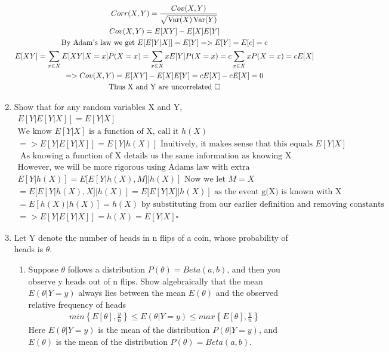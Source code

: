 \documentclass[11pt]{article}
\newcommand{\Var}{\mathop{\rm Var}}
\begin{document}
\begin{enumerate}
\begin{gather}
	Corr(X,Y) = \frac{Cov(X,Y)}{\sqrt{\Var(X)\Var(Y)}}\\
	Cov(X,Y) = E[XY] - E[X]E[Y]\\
	\text{By Adam's law we get }E[E[Y|X]] = E[Y] => E[Y] = E[c] = c\\
	E[XY] = \sum_{x\in X}E[XY|X=x]P(X=x) = \sum_{x\in X}xE[Y]P(X=x) = c\sum_{x\in X}xP(X=x) = cE[X]\\
	=> Cov(X,Y) = E[XY] - E[X]E[Y] = cE[X]-cE[X] = 0\\
	\text{Thus X and Y are uncorrelated }\square
\end{gather}
\item Show that for any random variables X and Y,
\begin{gather}
	E[Y|E[Y|X]]=E[Y|X]\\
	\text{We know }E[Y|X] \text{ is a function of X, call it }h(X)\\
	=> E[Y|E[Y|X]]=E[Y|h(X)]\text{ Inuitively, it makes sense that this equals } E[Y|X]\\
	\text{ As knowing a function of X details us the same information as knowing X}\\
	\text{However, we will be more rigorous using Adams law with extra conditioning}\\
	E[Y|h(X)] = E[E[Y|h(X),M]|h(X)] \text{ Now we let } M=X\\
	= E[E[Y|h(X),X]|h(X)] = E[E[Y|X]|h(X)] \text{ as the event g(X) is known with X}\\
	= E[h(X)|h(X)] = h(X) \text{ by substituting from our earlier definition and removing constants}\\
	=>	E[Y|E[Y|X]] = h(X) = E[Y|X]\square	
\end{gather}
\item Let Y denote the number of heads in n flips of a coin, whose probability of heads is $\theta$.
\begin{enumerate}
	\item Suppose $\theta$ follows a distribution $P(\theta) = Beta(a, b)$, and then you observe y heads out of n flips.
	Show algebraically that the mean $E(\theta | Y = y)$ always lies between the mean $E(\theta)$ and the observed
	relative frequency of heads
	\begin{gather}
		min\left\{E[\theta],\frac{y}{n}\right\}\le E(\theta | Y = y) \le max\left\{E[\theta],\frac{y}{n}\right\}
	\end{gather}
	Here $E(\theta| Y = y)$ is the mean of the distribution $P(\theta | Y = y)$, and $E(\theta)$ is the mean of the distribution $P(\theta) = Beta(a, b)$.

\end{enumerate}
\end{enumerate}
\end{document}
